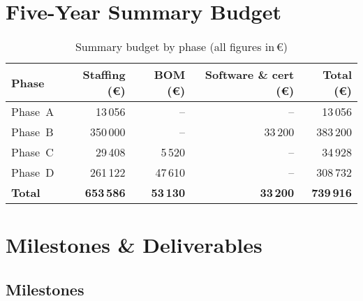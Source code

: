 \documentclass[a4paper,11pt]{article}
\begin{document}
\section{ Five-Year Summary Budget}

\begin{table}[ht]
\centering
\begin{tabular}{lrrrr}
\toprule
\textbf{Phase} & \textbf{Staffing (€)} & \textbf{BOM (€)} & \textbf{Software \& cert (€)} & \textbf{Total (€)} \\
\midrule
Phase A & 13\,056  & –      & –      & 13\,056  \\
Phase B & 350\,000 & –      & 33\,200 & 383\,200 \\
Phase C & 29\,408  & 5\,520 & –      & 34\,928  \\
Phase D & 261\,122 & 47\,610& –      & 308\,732 \\
\midrule
\textbf{Total} & \textbf{653\,586} & \textbf{53\,130} & \textbf{33\,200} & \textbf{739\,916} \\
\bottomrule
\end{tabular}
\caption{Summary budget by phase (all figures in €)}
\label{tab:budget-by-phase}
\end{table}



\newpage

\section{Milestones \& Deliverables}

\subsection{Milestones}
\end{document}
